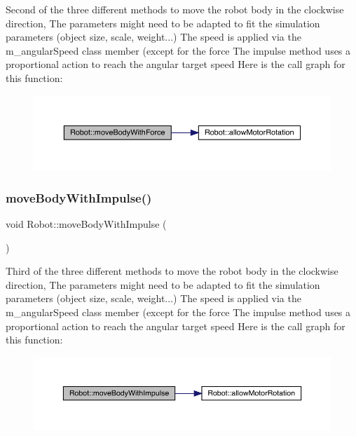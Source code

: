 Second of the three different methods to move the robot body in the clockwise direction, The parameters might need to be adapted to fit the simulation parameters (object size, scale, weight...) The speed is applied via the m\+\_\+angular\+Speed class member (except for the force The impulse method uses a proportional action to reach the angular target speed Here is the call graph for this function\+:\nopagebreak
\begin{figure}[H]
\begin{center}
\leavevmode
\includegraphics[width=350pt]{class_robot_ab713edf012849220f5096ea4b2d3e110_cgraph}
\end{center}
\end{figure}
\mbox{\label{class_robot_a2d8a6b3ef3bd324ac69119f80dc9f305}} 
\subsubsection{\texorpdfstring{move\+Body\+With\+Impulse()}{moveBodyWithImpulse()}}
{\footnotesize\ttfamily void Robot\+::move\+Body\+With\+Impulse (\begin{DoxyParamCaption}{ }\end{DoxyParamCaption})}

Third of the three different methods to move the robot body in the clockwise direction, The parameters might need to be adapted to fit the simulation parameters (object size, scale, weight...) The speed is applied via the m\+\_\+angular\+Speed class member (except for the force The impulse method uses a proportional action to reach the angular target speed Here is the call graph for this function\+:\nopagebreak
\begin{figure}[H]
\begin{center}
\leavevmode
\includegraphics[width=350pt]{class_robot_a2d8a6b3ef3bd324ac69119f80dc9f305_cgraph}
\end{center}
\end{figure}
\mbox{\label{class_robot_a55036d85a36c4e8ed3ff6f8381331c70}} 
